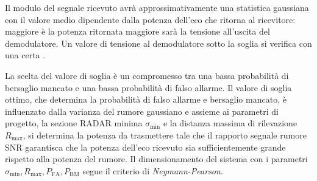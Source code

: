 Il modulo del segnale ricevuto avrà approssimativamente una statistica gaussiana con il valore medio dipendente dalla potenza dell'eco che ritorna al ricevitore: maggiore è la potenza ritornata maggiore sarà la tensione all'uscita del demodulatore. Un valore di tensione al demodulatore sotto la soglia si verifica con una certa .

La scelta del valore di soglia è un compromesso tra una bassa probabilità di bersaglio mancato e una bassa probabilità di falso allarme. Il valore di soglia ottimo, che determina la probabilità di falso allarme e bersaglio mancato, è influenzato dalla varianza del rumore gaussiano e assieme ai parametri di progetto, la sezione \ac{RADAR} minima $\sigma_\text{min}$ e la distanza massima di rilevazione $R_\text{max}$, si determina la potenza da trasmettere tale che il rapporto segnale rumore \ac{SNR} garantisca che la potenza dell'eco ricevuto sia sufficientemente grande rispetto alla potenza del rumore.
Il dimensionamento del sistema con i parametri $\sigma_\text{min},R_\text{max},P_\text{FA},P_\text{BM}$ segue il criterio di \emph{Neymann-Pearson}.

